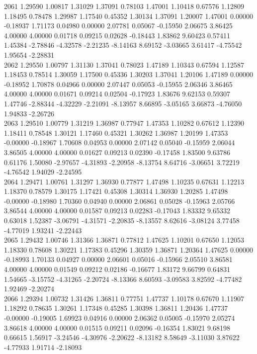 {2061 1.29590 1.00817 1.31029 1.37091 0.78103 1.47001 1.10418 0.67576 1.12809 1.18495 0.78478 1.29987 1.17540 0.45352 1.30134 1.37091 1.20007 1.47001 0.00000 -0.18937 1.71173 0.04980 0.00000 2.07781 0.05067 -0.15950 2.06675 3.86425 4.00000 4.00000 0.01718 0.09215 0.02628 -0.18443 1.83862 9.60423 0.57411 1.45384 -2.78846 -4.32578 -2.21235 -8.14163 8.69152 -3.03665 3.61417 -4.75542 1.95654 -2.28831 \\
2062 1.29550 1.00797 1.31130 1.37041 0.78023 1.47189 1.10343 0.67594 1.12587 1.18453 0.78514 1.30059 1.17500 0.45336 1.30203 1.37041 1.20106 1.47189 0.00000 -0.18952 1.70878 0.04966 0.00000 2.07447 0.05053 -0.15955 2.06346 3.86465 4.00000 4.00000 0.01671 0.09214 0.02504 -0.17923 1.83676 9.62153 0.59307 1.47746 -2.88344 -4.32229 -2.21091 -8.13957 8.66895 -3.05165 3.66873 -4.76050 1.94833 -2.26726 \\
2063 1.29510 1.00779 1.31219 1.36987 0.77947 1.47353 1.10282 0.67612 1.12390 1.18411 0.78548 1.30121 1.17460 0.45321 1.30262 1.36987 1.20199 1.47353 -0.00000 -0.18967 1.70608 0.04953 0.00000 2.07142 0.05040 -0.15959 2.06044 3.86505 4.00000 4.00000 0.01627 0.09213 0.02390 -0.17458 1.83500 9.63786 0.61176 1.50080 -2.97657 -4.31893 -2.20958 -8.13754 8.64716 -3.06651 3.72219 -4.76542 1.94029 -2.24595 \\
2064 1.29471 1.00761 1.31297 1.36930 0.77877 1.47498 1.10235 0.67631 1.12213 1.18370 0.78579 1.30175 1.17421 0.45308 1.30314 1.36930 1.20285 1.47498 -0.00000 -0.18980 1.70360 0.04940 0.00000 2.06861 0.05028 -0.15963 2.05766 3.86544 4.00000 4.00000 0.01587 0.09213 0.02283 -0.17043 1.83332 9.65332 0.63018 1.52387 -3.06791 -4.31571 -2.20835 -8.13557 8.62616 -3.08124 3.77458 -4.77019 1.93241 -2.22443 \\
2065 1.29432 1.00746 1.31366 1.36871 0.77812 1.47625 1.10201 0.67650 1.12053 1.18330 0.78608 1.30221 1.17383 0.45296 1.30359 1.36871 1.20364 1.47625 0.00000 -0.18993 1.70133 0.04927 0.00000 2.06601 0.05016 -0.15966 2.05510 3.86581 4.00000 4.00000 0.01549 0.09212 0.02186 -0.16677 1.83172 9.66799 0.64831 1.54665 -3.15752 -4.31265 -2.20724 -8.13366 8.60593 -3.09583 3.82592 -4.77482 1.92469 -2.20274 \\
2066 1.29394 1.00732 1.31426 1.36811 0.77751 1.47737 1.10178 0.67670 1.11907 1.18292 0.78635 1.30261 1.17348 0.45285 1.30398 1.36811 1.20436 1.47737 -0.00000 -0.19005 1.69923 0.04916 0.00000 2.06362 0.05005 -0.15970 2.05274 3.86618 4.00000 4.00000 0.01515 0.09211 0.02096 -0.16354 1.83021 9.68198 0.66615 1.56917 -3.24546 -4.30976 -2.20622 -8.13182 8.58649 -3.11030 3.87622 -4.77933 1.91714 -2.18093 \\
}
